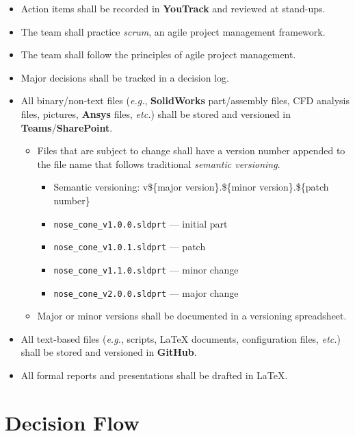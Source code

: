 \begin{itemize}
    \item Action items shall be recorded in \textbf{YouTrack} and reviewed at stand-ups.
    \item The team shall practice \textit{scrum}, an agile project management framework.
    \item The team shall follow the principles of agile project management.
    \item Major decisions shall be tracked in a decision log.
    \item All binary/non-text files (\textit{e.g.}, \textbf{SolidWorks} part/assembly files, CFD analysis files, pictures, \textbf{Ansys} files, \textit{etc.}) shall be stored and versioned in \textbf{Teams}/\textbf{SharePoint}.
    \begin{itemize}
        \item Files that are subject to change shall have a version number appended to the file name that follows traditional \textit{semantic versioning}.
        \begin{itemize}
            \item Semantic versioning: v\$\{major version\}.\$\{minor version\}.\$\{patch number\}
            \item \verb|nose_cone_v1.0.0.sldprt| — initial part
            \item \verb|nose_cone_v1.0.1.sldprt| — patch
            \item \verb|nose_cone_v1.1.0.sldprt| — minor change
            \item \verb|nose_cone_v2.0.0.sldprt| — major change
        \end{itemize}
        \item Major or minor versions shall be documented in a versioning spreadsheet.
    \end{itemize}
    \item All text-based files (\textit{e.g.}, scripts, \LaTeX{} documents, configuration files, \textit{etc.}) shall be stored and versioned in \textbf{GitHub}.
    \item All formal reports and presentations shall be drafted in \LaTeX.
\end{itemize}

\section{Decision Flow}

